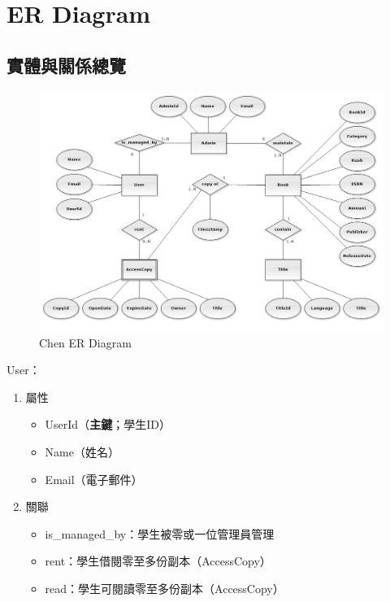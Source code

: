 \chapter{ER Diagram}

\section{實體與關係總覽}

\begin{figure}[ht]
    \centering
    \includegraphics[width=\linewidth]{image/ChenERDiagram.png}
    \captionsetup{justification=centering}
    \caption{Chen ER Diagram}
\end{figure}

\hspace*{-2em}User：

\begin{enumerate}
\item 屬性
    \begin{itemize}
    \item UserId（\textbf{主鍵}；學生ID）
    \item Name（姓名）
    \item Email（電子郵件）
    \end{itemize}
\item 關聯
    \begin{itemize}
    \item is\_managed\_by：學生被零或一位管理員管理
    \item rent：學生借閱零至多份副本（AccessCopy）
    \item read：學生可閱讀零至多份副本（AccessCopy）
    \end{itemize}
\end{enumerate}

